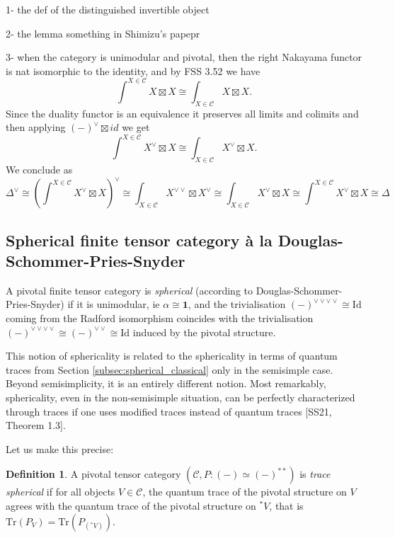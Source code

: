 \documentclass[11pt]{article}
\newcommand{\C}{\mathcal{C}}
\theoremstyle{definition}
\newtheorem{definition}[theorem]{Definition}
\begin{document}
1- the def of the distinguished invertible object

2- the lemma something in Shimizu's papepr

3- when the category is unimodular and pivotal, then the right Nakayama functor is nat isomorphic to the identity, and by FSS 3.52 we have $$ \int^{X \in \C} X \boxtimes X \cong  \int_{X \in \C} X \boxtimes X.$$ Since the duality functor is an equivalence it preserves all limits and colimits and then applying $(-)^\vee \boxtimes id$ we get
$$ \int^{X \in \C} X^\vee \boxtimes X \cong  \int_{X \in \C} X^\vee \boxtimes X.$$
We conclude as 
$$  \Delta^\vee \cong \left( \int^{X \in \C} X^\vee \boxtimes X  \right)^\vee \cong   \int_{X \in \C} X^{\vee \vee} \boxtimes X^\vee \cong    \int_{X \in \C} X^\vee \boxtimes X \cong   \int^{X \in \C} X^\vee \boxtimes X \cong \Delta $$




\subsection{Spherical finite tensor category à la Douglas-Schommer-Pries-Snyder}

A pivotal finite tensor category is \textit{spherical} (according to Douglas-Schommer-Pries-Snyder) if it is unimodular, ie $\alpha \cong \mathbf{1}$, and the trivialisation $(-)^{\vee \vee \vee \vee} \cong \mathrm{Id}$ coming from the Radford isomorphism coincides with the   trivialisation $(-)^{\vee \vee \vee \vee} \cong (-)^{ \vee \vee} \cong  \mathrm{Id}$ induced by the pivotal structure.


This notion of sphericality is related to the sphericality in terms of quantum traces from Section \ref{subsec:spherical_classical} only in the semisimple case. Beyond semisimplicity, it is an entirely different notion. Most remarkably, sphericality, even in the non-semisimple situation, can be perfectly characterized through traces if one uses modified traces instead of quantum traces [SS21, Theorem 1.3].



Let us make this precise:


\begin{definition}
A pivotal tensor category $(\mathcal{C}, P : (-) \simeq (-)^{**})$ is \textit{trace spherical} if for all objects $V \in \mathcal{C}$, the quantum trace of the pivotal structure on $V$ agrees with the quantum trace of the pivotal structure on $^*V$, that is $\mathrm{Tr}(P_V) = \mathrm{Tr}(P_{(^*V)})$.
\end{definition}
\end{document}
